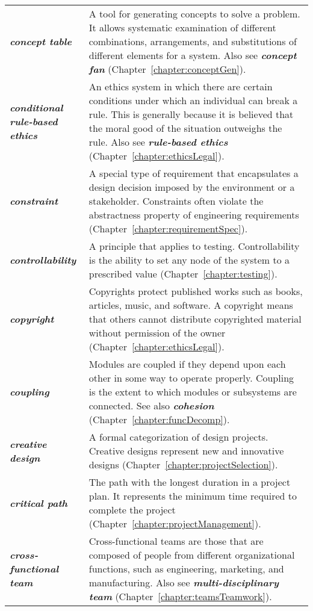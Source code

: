 \begin{longtable} { p{3cm} p{11cm}}
\emph{\textbf{concept table}} & A tool for generating concepts to solve
a problem. It allows systematic examination of different combinations,
arrangements, and substitutions of different elements for a system. Also
see \emph{\textbf{concept fan}} (Chapter~\ref{chapter:conceptGen}). \B \\
\emph{\textbf{conditional rule-based ethics}} & An ethics system in
which there are certain conditions under which an individual can break a
rule. This is generally because it is believed that the moral good of
the situation outweighs the rule. Also see \emph{\textbf{rule-based
ethics}} (Chapter~\ref{chapter:ethicsLegal}). \B \\
\emph{\textbf{constraint}} & A special type of requirement that
encapsulates a design decision imposed by the environment or a
stakeholder. Constraints often violate the abstractness property of
engineering requirements (Chapter~\ref{chapter:requirementSpec}). \B \\
\emph{\textbf{controllability}} & A principle that applies to testing.
Controllability is the ability to set any node of the system to a
prescribed value (Chapter~\ref{chapter:testing}). \B \\
\emph{\textbf{copyright}} & Copyrights protect published works such as
books, articles, music, and software. A copyright means that others
cannot distribute copyrighted material without permission of the owner
(Chapter~\ref{chapter:ethicsLegal}). \B \\
\emph{\textbf{coupling}} & Modules are coupled if they depend upon each
other in some way to operate properly. Coupling is the extent to which
modules or subsystems are connected. See also \emph{\textbf{cohesion}}
(Chapter~\ref{chapter:funcDecomp}). \B \\
\emph{\textbf{creative design}} & A formal categorization of design
projects. Creative designs represent new and innovative designs 
(Chapter~\ref{chapter:projectSelection}). \B \\
\emph{\textbf{critical path}} & The path with the longest duration in a
project plan. It represents the minimum time required to complete the
project (Chapter~\ref{chapter:projectManagement}). \B \\
\emph{\textbf{cross-functional team}} & Cross-functional teams are those
that are composed of people from different organizational functions,
such as engineering, marketing, and manufacturing. Also see
\emph{\textbf{multi-disciplinary team}} (Chapter~\ref{chapter:teamsTeamwork}). \B \\

\end{longtable}
